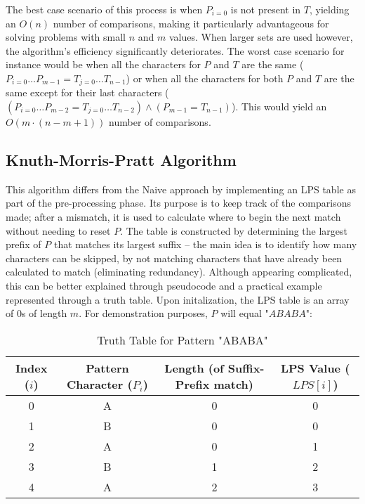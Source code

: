 \documentclass[12pt]{article}
\begin{document}
The best case scenario of this process is when $P_{i=0}$ is not present in $T$, yielding an
$O(n)$ number of comparisons, making it particularly advantageous for solving problems
with small $n$ and $m$ values. When larger sets are used however, the algorithm's efficiency significantly deteriorates. The worst case scenario for instance would be when
all the characters for $P$ and $T$ are the same (${P_{i=0} \ldots P_{m-1}} = {T_{j=0} \ldots T_{n-1}}$) or
when all the characters for both $P$ and $T$ are the same except for their last characters ($({P_{i=0} \ldots P_{m-2}} = {T_{j=0} \ldots T_{n-2}}) \land (P_{m-1} = T_{n-1})$). This would yield an
$O(m \cdot (n - m + 1))$ number of comparisons.

\subsection{Knuth-Morris-Pratt Algorithm}

\parencite{2} \parencite{9} This algorithm differs from the Naive approach by implementing an LPS table
as part of the pre-processing phase. Its purpose is to keep track of the comparisons made;
after a mismatch, it is used to calculate where to begin the next match without needing
to reset $P$. The table is constructed by determining the largest prefix of $P$ that matches
its largest suffix -- the main idea is to identify how many characters can be skipped, by not
matching characters that have already been calculated to match (eliminating redundancy).
Although appearing complicated, this can be better explained through pseudocode and a
practical example represented through a truth table. Upon initalization, the LPS table is
an array of 0s of length $m$. For demonstration purposes, $P$ will equal "$ABABA$":

\begin{table}[!htbp]
    \centering
    \begin{tabular}{|c|c|c|c|}
        \hline
        Index ($i$) & Pattern Character ($P_{i}$) & Length (of Suffix-Prefix match) & LPS Value ($LPS[i]$) \\
        \hline
        0 & A & 0 & 0 \\
        1 & B & 0 & 0 \\
        2 & A & 0 & 1 \\
        3 & B & 1 & 2 \\
        4 & A & 2 & 3 \\
        \hline
    \end{tabular}
    \caption{Truth Table for Pattern "ABABA"}
\end{table}
\end{document}
